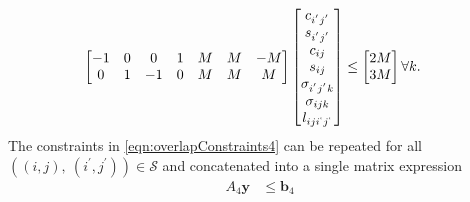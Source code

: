 	\begin{equation}\label{eqn:overlapConstraints4}\begin{aligned} 
		\begin{bmatrix} 
			-1 & 0 &  0 & 1 & M & M & -M \\
			 0 & 1 & -1 & 0 & M & M &  M \\
		\end{bmatrix} 
		\begin{bmatrix}
			c_{i^{'}j^{'}}       \\ 
			s_{i^{'}j^{'}}       \\
			c_{ij}               \\
			s_{ij}               \\ 
			\sigma_{i^{'}j^{'}k} \\ 
			\sigma_{ijk}         \\
			l_{iji^{`}j^{`}}     \\
		\end{bmatrix} &\le 
		\begin{bmatrix} 
			2M \\ 
			3M \\
		\end{bmatrix} \forall k.
	\end{aligned} \end{equation}
	The constraints in \eqref{eqn:overlapConstraints4} can be repeated for all $\left ( (i,j), \ (i^{'},j^{'}) \right ) \in \mathcal{S}$ and concatenated into a single matrix expression
	\begin{equation}\begin{aligned} 
		A_4\mathbf{y} & \le \mathbf{b}_4 \\
	\end{aligned} \end{equation} 
